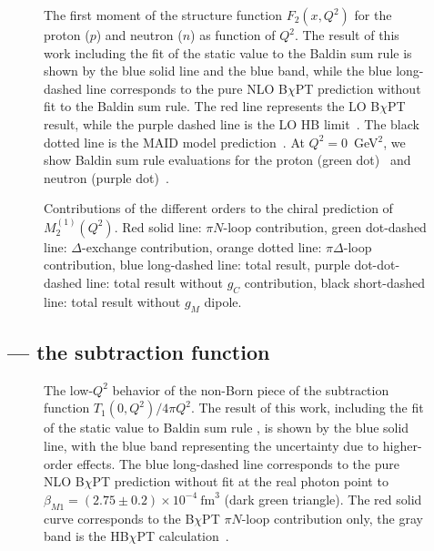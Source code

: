 \documentclass[12pt,preprint,tightenlines,
showpacs,preprintnumbers,amsmath,amssymb,
a4paper,nofootinbib]{revtex4-1}
\begin{document}
\begin{figure}[hbt]
\begin{center}
\caption{
The first moment of the structure function $F_2(x,Q^2)$ for the proton ($p$) and neutron ($n$) as function of $Q^2$.  
The result of this work including the fit of the static value to the Baldin sum rule is shown by the blue solid line and the blue band, while the blue long-dashed line corresponds to the pure NLO B$\chi$PT prediction without fit to the Baldin sum rule.
The red line represents the LO B$\chi$PT result, while the purple dashed line is the LO HB limit~\cite{Nevado:2007dd}.
The black dotted line is the MAID model prediction~\cite{Drechsel:2000ct,Drechsel:1998hk,private-Lothar}.
At $Q^2=0$~GeV$^2$, we show Baldin sum rule evaluations for the proton (green dot)~\cite{Gryniuk:2015aa} and neutron (purple dot)~\cite{Levchuk:1999zy}.
 \label{Fig:M21plot}}
\end{center}
\end{figure}

\begin{figure}
\begin{center}
\caption{\small{Contributions of the different orders to the chiral prediction of $M_2^{(1)}(Q^2)$. Red solid line: $\pi N$-loop contribution, green dot-dashed line: $\Delta$-exchange contribution, orange dotted line: $\pi \Delta$-loop contribution, blue long-dashed line: total result, purple dot-dot-dashed line: total result without $g_C$ contribution, black short-dashed line: total result without $g_M$ dipole.}\label{Fig:M21-orders}}
\end{center}
\end{figure}

\subsection{ --- the subtraction function}


\begin{figure}[bt]
\begin{center}
\caption{The low-$Q^2$ behavior of the non-Born piece of the subtraction function $T_1(0,Q^2)/4\pi Q^2$. The result of this work, including the fit of the static value to Baldin sum rule \cite{Gryniuk:2015aa}, is shown by the blue solid line, with the blue band representing the uncertainty due to higher-order effects. The blue long-dashed line corresponds to the pure NLO B$\chi$PT prediction without fit at the real photon point to $\beta_{M1}=(2.75\pm 0.2)\times 10^{-4}~\text{fm}^3$ (dark green triangle). The red solid curve corresponds to the B$\chi$PT $\pi N$-loop contribution only, the gray band is the HB$\chi$PT calculation~\cite{Birse:2012eb}.
}
\label{fig:subtraction}
\end{center}
\end{figure}
\end{document}
